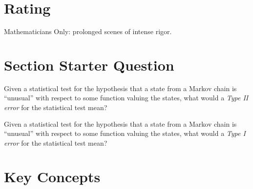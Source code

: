 \documentclass[12pt]{article}
\begin{document}
\myheader \mytitle

\hr


\hr

\usefirefox

\hr



\section*{Rating} %
Mathematicians Only:  prolonged scenes of intense rigor.

\hr

\section*{Section Starter Question}

Given a statistical test for the hypothesis that a state from a Markov
chain is ``unusual'' with respect to some function valuing the states,
what would a \emph{Type II error} for the statistical test mean?

Given a statistical test for the hypothesis that a state from a
Markov chain is ``unusual'' with respect to some function
valuing the states, what would a \emph{Type I error} for the statistical
test mean?

\hr

\section*{Key Concepts}
\end{document}

